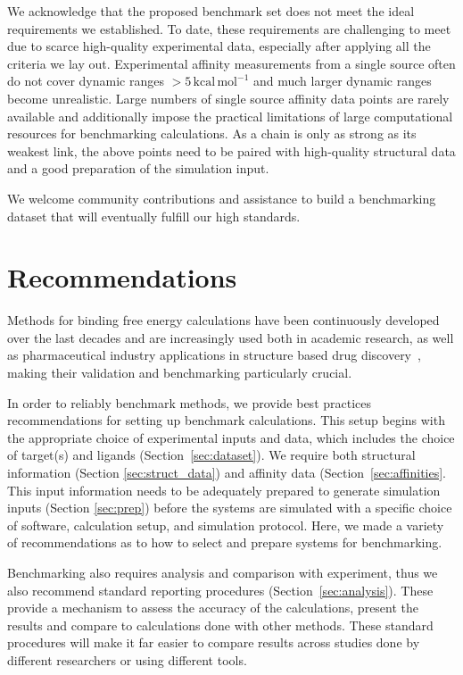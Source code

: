 \documentclass[9pt,bestpractices]{livecoms}
\begin{document}
We acknowledge that the proposed benchmark set does not meet the ideal requirements we established. To date, these requirements are challenging to meet due to scarce high-quality experimental data, especially after applying all the criteria we lay out. Experimental affinity measurements from a single source often do not cover dynamic ranges $>5\,\mathrm{kcal\,mol^{-1}}$ and much larger dynamic ranges become unrealistic. Large numbers of single source affinity data points are rarely available and additionally impose the practical limitations of large computational resources for benchmarking calculations. As a chain is only as strong as its weakest link, the above points need to be paired with high-quality structural data and a good preparation of the simulation input. 

We welcome community contributions and assistance to build a benchmarking dataset that will eventually fulfill our high standards.

\section{Recommendations}
\label{sec:recommendations}

Methods for binding free energy calculations have been continuously developed over the last decades and are increasingly used both in academic research, as well as pharmaceutical industry applications in structure based drug discovery~\cite{sherborne_collaborating_2016, gapsysLargeScaleRelative2020,schindler_largescale_2020}, making their validation and benchmarking particularly crucial. 
%

In order to reliably benchmark methods, we provide best practices recommendations for setting up benchmark calculations.
This setup begins with the appropriate choice of experimental inputs and data, which includes the choice of target(s) and ligands (Section~\ref{sec:dataset}). 
We require both
structural information (Section \ref{sec:struct_data}) and 
affinity data (Section~\ref{sec:affinities}.
This input information needs to be adequately prepared to generate simulation inputs (Section \ref{sec:prep}) before the systems are simulated with a specific choice of 
software, calculation setup, and simulation protocol. 
Here, we made a variety of recommendations as to how to select and prepare systems for benchmarking.

Benchmarking also requires analysis and comparison with experiment, thus we also recommend standard reporting procedures (Section~\ref{sec:analysis}). These provide a mechanism to assess the accuracy of the calculations, present the results and compare to calculations done with other methods. These standard procedures will make it far easier to compare results across studies done by different researchers or using different tools.
\end{document}
